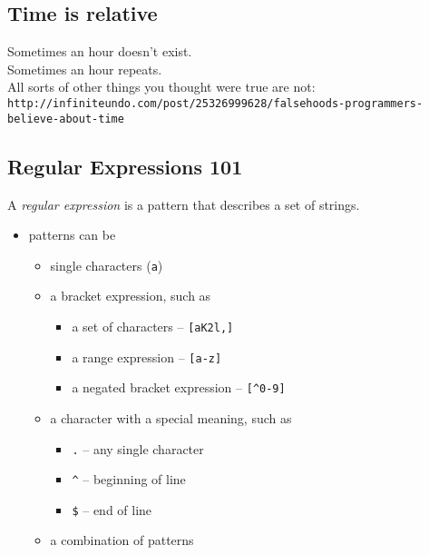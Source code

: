 \documentclass[xga]{xdvislides}
\begin{document}
\subsection{Time is relative}
Sometimes an hour doesn't exist. \\

\vspace{.5in}
Sometimes an hour repeats. \\

\vspace{.5in}
All sorts of other things you thought were true are not: \\
\verb+http://infiniteundo.com/post/25326999628/falsehoods-programmers-believe-about-time+

\subsection{Regular Expressions 101}
A {\em regular expression} is a pattern that describes a set of strings. \\

\begin{itemize}
	\item patterns can be
		\begin{itemize}
			\item single characters (\verb+a+)
			\item a bracket expression, such as
				\begin{itemize}
					\item a set of characters -- \verb+[aK2l,]+
					\item a range expression -- \verb+[a-z]+
					\item a negated bracket expression -- \verb+[^0-9]+
				\end{itemize}
			\item a character with a special meaning, such as
				\begin{itemize}
					\item \verb+.+ -- any single character
					\item \verb+^+ -- beginning of line
					\item \verb+$+ -- end of line
				\end{itemize}
			\item a combination of patterns
		\end{itemize}
\end{itemize}
\end{document}
